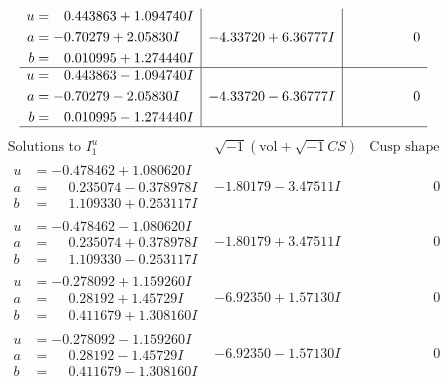 \documentclass[1p]{elsarticle_modified}
\theoremstyle{definition}
\newcommand{\I}{\sqrt{-1}}
\begin{document}
$$\begin{array}{c|c|c}
\begin{aligned}
u &= \phantom{-}0.443863 + 1.094740 I \\
a &= -0.70279 + 2.05830 I \\
b &= \phantom{-}0.010995 + 1.274440 I\end{aligned}
 & -4.33720 + 6.36777 I & \phantom{-0.000000 } 0 \\ \hline\begin{aligned}
u &= \phantom{-}0.443863 - 1.094740 I \\
a &= -0.70279 - 2.05830 I \\
b &= \phantom{-}0.010995 - 1.274440 I\end{aligned}
 & -4.33720 - 6.36777 I & \phantom{-0.000000 } 0\\
 \hline 
 \end{array}$$\newpage$$\begin{array}{c|c|c}  
\text{Solutions to }I^u_{1}& \I (\text{vol} + \sqrt{-1}CS) & \text{Cusp shape}\\
 \hline 
\begin{aligned}
u &= -0.478462 + 1.080620 I \\
a &= \phantom{-}0.235074 - 0.378978 I \\
b &= \phantom{-}1.109330 + 0.253117 I\end{aligned}
 & -1.80179 - 3.47511 I & \phantom{-0.000000 } 0 \\ \hline\begin{aligned}
u &= -0.478462 - 1.080620 I \\
a &= \phantom{-}0.235074 + 0.378978 I \\
b &= \phantom{-}1.109330 - 0.253117 I\end{aligned}
 & -1.80179 + 3.47511 I & \phantom{-0.000000 } 0 \\ \hline\begin{aligned}
u &= -0.278092 + 1.159260 I \\
a &= \phantom{-}0.28192 + 1.45729 I \\
b &= \phantom{-}0.411679 + 1.308160 I\end{aligned}
 & -6.92350 + 1.57130 I & \phantom{-0.000000 } 0 \\ \hline\begin{aligned}
u &= -0.278092 - 1.159260 I \\
a &= \phantom{-}0.28192 - 1.45729 I \\
b &= \phantom{-}0.411679 - 1.308160 I\end{aligned}
 & -6.92350 - 1.57130 I & \phantom{-0.000000 } 0 \\ \hline\begin{aligned}

\end{aligned}
\end{array}$$
\end{document}
